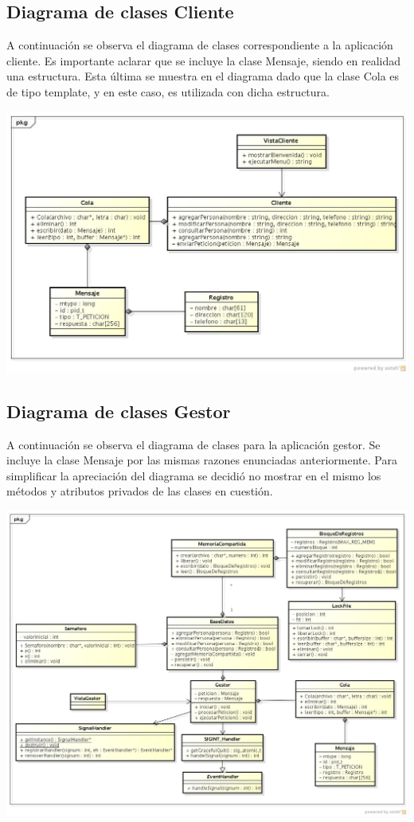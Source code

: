 \documentclass[11pt]{article}
\begin{document}
\subsection{Diagrama de clases Cliente}
A continuaci\'on se observa el diagrama de clases correspondiente a la aplicaci\'on cliente. Es importante aclarar que se incluye la clase Mensaje, 
siendo en realidad una estructura. Esta última se muestra en el diagrama dado que la clase Cola es de tipo template, y en este caso, es utilizada 
con dicha estructura. 
\begin{center}
\includegraphics[scale=0.45,width=1.02\textwidth]{ClasesCliente} 
\end{center}


\subsection{Diagrama de clases Gestor}
A continuaci\'on se observa el diagrama de clases para la aplicaci\'on gestor. Se incluye la clase Mensaje por las mismas razones enunciadas anteriormente.
Para simplificar la apreciaci\'on del diagrama se decidi\'o no mostrar en el mismo los m\'etodos y atributos privados de las clases en cuesti\'on.

\begin{center}
\includegraphics[scale=0.5, height=0.8\textheight,width=1.02\textwidth]{ClasesGestor} 
\end{center}
\end{document}
